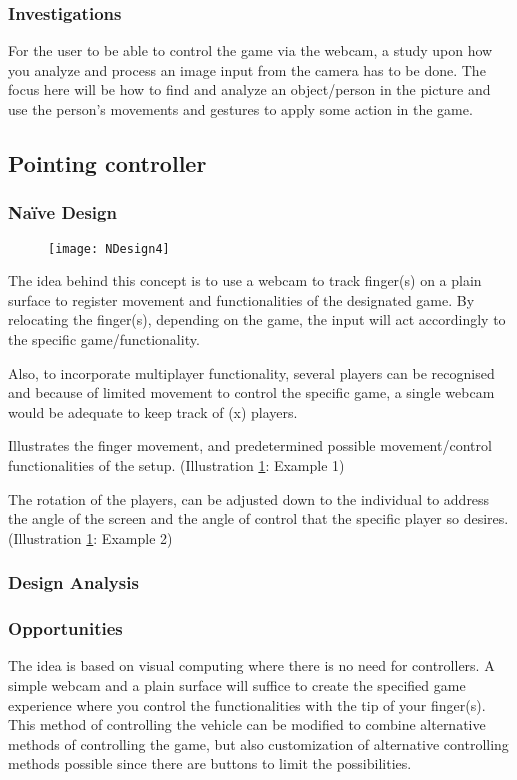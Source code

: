 \subsubsection*{Investigations}
For the user to be able to control the game via the webcam, a study upon how you analyze and process an image input from the camera has to be done. The focus here will be how to find and analyze an object/person in the picture and use the person’s movements and gestures to apply some action in the game.

\pagebreak

\subsection{Pointing controller} \label{nd4}
\subsubsection*{Naïve Design}
\begin{figure}[h]
\centering
\texttt{[image: NDesign4]}
\caption{}
\label{fig:ndesign4}
\end{figure}

The idea behind this concept is to use a webcam to track finger(s) on a plain surface to register movement and functionalities of the designated game. By relocating the finger(s), depending on the game, the input will act accordingly to the specific game/functionality.
\bigskip

Also, to incorporate multiplayer functionality, several players can be recognised and because of limited movement to control the specific game, a single webcam would be adequate to keep track of (x) players.
\bigskip

Illustrates the finger movement, and predetermined possible movement/control functionalities of the setup. (Illustration \ref{fig:ndesign4}: Example 1)
\bigskip

The rotation of the players, can be adjusted down to the individual to address the angle of the screen and the angle of control that the specific player so desires. (Illustration \ref{fig:ndesign4}: Example 2)


\subsubsection*{Design Analysis}
\subsubsection*{Opportunities}
The idea is based on visual computing where there is no need for controllers. A simple webcam and a plain surface will suffice to create the specified game experience where you control the functionalities with the tip of your finger(s). This method of controlling the vehicle can be modified to combine alternative methods of controlling the game, but also customization of alternative controlling methods possible since there are buttons to limit the possibilities.


